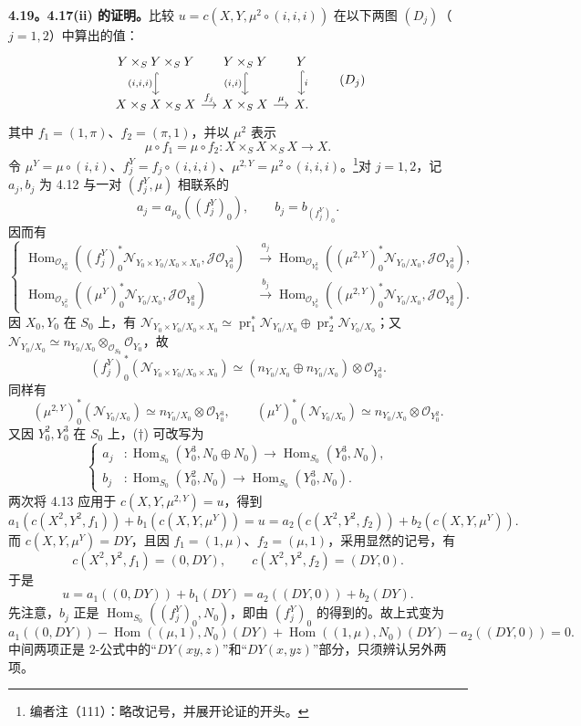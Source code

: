 \textbf{4.19。4.17(ii) 的证明。}比较 $u=c(X,Y,\mu^2\circ(i,i,i))$ 在以下两图 $(D_j)$（$j=1,2$）中算出的值：
\[
\begin{tikzcd}[column sep=small]
Y\times_S Y\times_S Y\arrow[d,hook,"{(i,i,i)}"']&Y\times_S Y\arrow[d,hook,"{(i,i)}"']&Y\arrow[d,hook,"i"]\\
X\times_S X\times_S X\arrow[r,"f_j"]&X\times_S X\arrow[r,"\mu"]&X.
\end{tikzcd}\qquad(D_j)
\]
其中 $f_1=(1,\pi)$、$f_2=(\pi,1)$，并以 $\mu^2$ 表示
\[\mu\circ f_1=\mu\circ f_2:X\times_S X\times_S X\longrightarrow X.\]
令 $\mu^Y=\mu\circ(i,i)$、$f_j^Y=f_j\circ(i,i,i)$、$\mu^{2,Y}=\mu^2\circ(i,i,i)$。\footnote{编者注（111）：略改记号，并展开论证的开头。}对 $j=1,2$，记 $a_j,b_j$ 为 4.12 与一对 $(f_j^Y,\mu)$ 相联系的
\[a_j=a_{\mu_0}((f_j^Y)_0),\qquad b_j=b_{(f_j^Y)_0}.\]
因而有
\[
\left\{\begin{aligned}
\operatorname{Hom}_{\mathscr O_{Y_0^3}}((f_j^Y)_0^*\mathscr N_{Y_0\times Y_0/X_0\times X_0},\mathscr J\mathscr O_{Y_0^3})&\xrightarrow{a_j}\operatorname{Hom}_{\mathscr O_{Y_0^3}}((\mu^{2,Y})_0^*\mathscr N_{Y_0/X_0},\mathscr J\mathscr O_{Y_0^3}),\\
\operatorname{Hom}_{\mathscr O_{Y_0^2}}((\mu^Y)_0^*\mathscr N_{Y_0/X_0},\mathscr J\mathscr O_{Y_0^2})&\xrightarrow{b_j}\operatorname{Hom}_{\mathscr O_{Y_0^3}}((\mu^{2,Y})_0^*\mathscr N_{Y_0/X_0},\mathscr J\mathscr O_{Y_0^3}).
\end{aligned}\right.\tag{$\dagger$}
\]
因 $X_0,Y_0$ 在 $S_0$ 上，有 $\mathscr N_{Y_0\times Y_0/X_0\times X_0}\simeq\operatorname{pr}_1^*\mathscr N_{Y_0/X_0}\oplus\operatorname{pr}_2^*\mathscr N_{Y_0/X_0}$；又 $\mathscr N_{Y_0/X_0}\simeq n_{Y_0/X_0}\otimes_{\mathscr O_{S_0}}\mathscr O_{Y_0}$，故
\[(f_j^Y)_0^*(\mathscr N_{Y_0\times Y_0/X_0\times X_0})\simeq(n_{Y_0/X_0}\oplus n_{Y_0/X_0})\otimes\mathscr O_{Y_0^3}.\]
同样有
\[(\mu^{2,Y})_0^*(\mathscr N_{Y_0/X_0})\simeq n_{Y_0/X_0}\otimes\mathscr O_{Y_0^3},\qquad(\mu^Y)_0^*(\mathscr N_{Y_0/X_0})\simeq n_{Y_0/X_0}\otimes\mathscr O_{Y_0^2}.\]
又因 $Y_0^2,Y_0^3$ 在 $S_0$ 上，($\dagger$) 可改写为
\[\left\{\begin{aligned}
a_j&:\operatorname{Hom}_{S_0}(Y_0^3,N_0\oplus N_0)\longrightarrow\operatorname{Hom}_{S_0}(Y_0^3,N_0),\\
b_j&:\operatorname{Hom}_{S_0}(Y_0^2,N_0)\longrightarrow\operatorname{Hom}_{S_0}(Y_0^3,N_0).
\end{aligned}\right.\tag{$\ddagger$}\]
两次将 4.13 应用于 $c(X,Y,\mu^{2,Y})=u$，得到
\[a_1(c(X^2,Y^2,f_1))+b_1(c(X,Y,\mu^Y))=u=a_2(c(X^2,Y^2,f_2))+b_2(c(X,Y,\mu^Y)).\]
而 $c(X,Y,\mu^Y)=DY$，且因 $f_1=(1,\mu)$、$f_2=(\mu,1)$，采用显然的记号，有
\[c(X^2,Y^2,f_1)=(0,DY),\qquad c(X^2,Y^2,f_2)=(DY,0).\]
于是
\[u=a_1((0,DY))+b_1(DY)=a_2((DY,0))+b_2(DY).\]
先注意，$b_j$ 正是 $\operatorname{Hom}_{S_0}((f_j^Y)_0,N_0)$，即由 $(f_j^Y)_0$ 的得到的。故上式变为
\[a_1((0,DY))-\operatorname{Hom}((\mu,1),N_0)(DY)+\operatorname{Hom}((1,\mu),N_0)(DY)-a_2((DY,0))=0.\]
中间两项正是 $2$-公式中的“$DY(xy,z)$”和“$DY(x,yz)$”部分，只须辨认另外两项。

